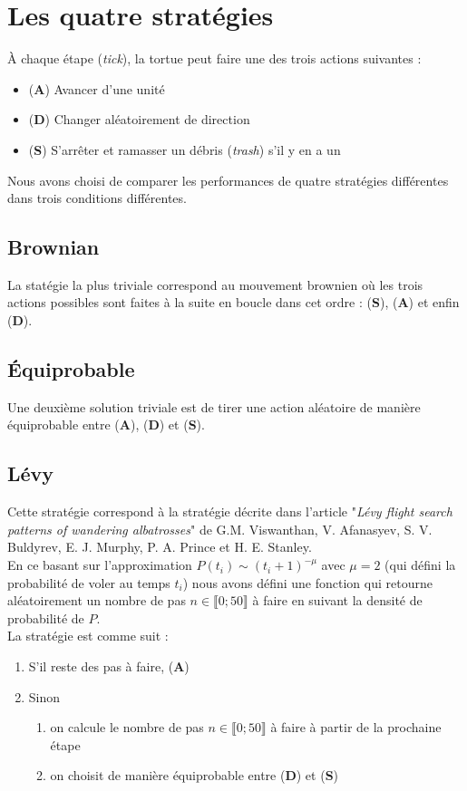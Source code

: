 \section{Les quatre stratégies}
\`{A} chaque étape (\emph{tick}), la tortue peut faire une des trois actions suivantes :
\begin{itemize}
\item (\textbf{A}) Avancer d'une unité
\item (\textbf{D}) Changer aléatoirement de direction
\item (\textbf{S}) S'arrêter et ramasser un débris (\emph{trash}) s'il y en a un
\end{itemize}
Nous avons choisi de comparer les performances de 
quatre stratégies différentes dans trois conditions différentes.

\subsection{Brownian}
La statégie la plus triviale correspond au mouvement brownien où les
trois actions possibles sont faites à la suite en boucle dans cet ordre :
(\textbf{S}), (\textbf{A}) et enfin (\textbf{D}).

\subsection{\'{E}quiprobable}
Une deuxième solution triviale est de tirer une action aléatoire de manière
équiprobable entre (\textbf{A}), (\textbf{D}) et (\textbf{S}).
\subsection{Lévy}
Cette stratégie correspond à la stratégie décrite dans l'article 
"\emph{Lévy flight search patterns of wandering albatrosses}" de 
G.M. Viswanthan, V. Afanasyev, S. V. Buldyrev, E. J. Murphy, 
P. A. Prince et H. E. Stanley. \\
En ce basant sur l'approximation $P(t_i) \sim (t_i + 1)^{-\mu}$ avec $\mu = 2$
(qui défini la probabilité de voler au temps $t_i$) nous
avons défini une fonction qui retourne aléatoirement
un nombre de pas $n \in \llbracket 0; 50 \rrbracket$ à faire en suivant la densité de probabilité de $P$.\\
La stratégie est comme suit :
\begin{enumerate}
\item S'il reste des pas à faire, (\textbf{A})
\item Sinon 
\begin{enumerate}
\item on calcule le nombre de pas $n \in \llbracket 0; 50 \rrbracket$ à faire à partir de la prochaine étape
\item on choisit de manière équiprobable entre (\textbf{D}) et (\textbf{S})
\end{enumerate}
\end{enumerate}

